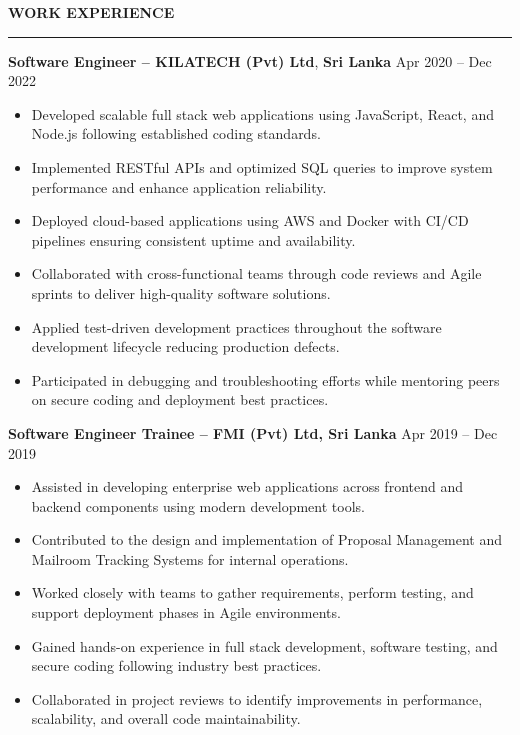 \documentclass[10pt,letterpaper]{article}
\begin{document}
\textbf{WORK EXPERIENCE}\\[-8pt]
\noindent\rule{\textwidth}{1pt}

\vspace{-2pt}

\textbf{Software Engineer -- KILATECH (Pvt) Ltd}, \textbf{Sri Lanka} \hfill Apr 2020 -- Dec 2022

\vspace{-1pt}

\begin{itemize}
\item Developed scalable full stack web applications using JavaScript, React, and Node.js following established coding standards.
\item Implemented RESTful APIs and optimized SQL queries to improve system performance and enhance application reliability.
\item Deployed cloud-based applications using AWS and Docker with CI/CD pipelines ensuring consistent uptime and availability.
\item Collaborated with cross-functional teams through code reviews and Agile sprints to deliver high-quality software solutions.
\item Applied test-driven development practices throughout the software development lifecycle reducing production defects.
\item Participated in debugging and troubleshooting efforts while mentoring peers on secure coding and deployment best practices.
\end{itemize}

\textbf{Software Engineer Trainee -- FMI (Pvt) Ltd, Sri Lanka} \hfill Apr 2019 -- Dec 2019

\vspace{-1pt}

\begin{itemize}
\item Assisted in developing enterprise web applications across frontend and backend components using modern development tools.
\item Contributed to the design and implementation of Proposal Management and Mailroom Tracking Systems for internal operations.
\item Worked closely with teams to gather requirements, perform testing, and support deployment phases in Agile environments.
\item Gained hands-on experience in full stack development, software testing, and secure coding following industry best practices.
\item Collaborated in project reviews to identify improvements in performance, scalability, and overall code maintainability.
\end{itemize}
\end{document}
